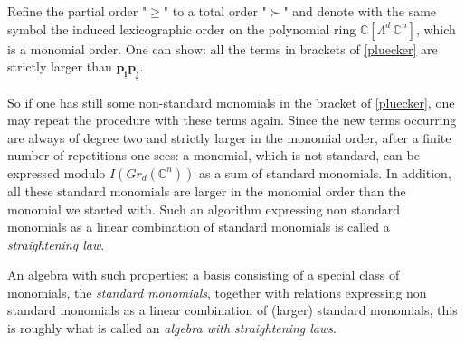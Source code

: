 \documentclass{emsprocart}
\theoremstyle{definition}
\begin{document}
Refine the partial order "$\ge$" to a total order "$\succ$" and denote with the same symbol
the induced lexicographic order on the polynomial ring $\mathbb C[\Lambda^d\,\mathbb C^n]$,
which is a monomial order. One can show: all the terms in brackets of \eqref{pluecker} are strictly
larger than $\mathbf p_{\underline{\mathbf i}}\mathbf p_{\underline{\mathbf j}}$.

So if one has still some non-standard monomials in the bracket of \eqref{pluecker},
one may repeat the procedure with these terms again. Since the new terms occurring are always of degree two
and strictly larger in the monomial order, after a finite number of repetitions one sees: a monomial, which is not standard,
can be expressed modulo $I(Gr_{d}(\mathbb C^n))$ as a sum of standard monomials. In addition, all these standard monomials are larger in the
monomial order than the monomial we started with. Such an algorithm expressing non standard monomials as a linear combination of
standard monomials is called a {\it straightening law}.

An algebra with such properties: a basis consisting of a special class of monomials, the {\it standard monomials},
together with relations expressing non standard monomials as a linear combination of
(larger) standard monomials, this is roughly what is called an {\it algebra with straightening laws}.
\end{document}
